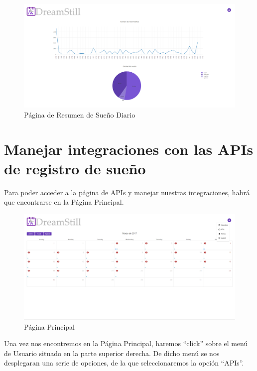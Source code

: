\documentclass[11pt,openany]{book}
\begin{document}
\begin{figure}[H]
\centering
\includegraphics[totalheight=7cm]{manualUsuario/resumenSue_oDiario.png}
\caption{Página de Resumen de Sueño Diario}
\end{figure}

\section{Manejar integraciones con las APIs de registro de sueño}

Para poder acceder a la página de APIs y manejar nuestras integraciones, habrá que encontrarse en la Página Principal.

\begin{figure}[H]
\centering
\includegraphics[totalheight=7cm]{manualUsuario/paginaPrincipal.png}
\caption{Página Principal}
\end{figure}

Una vez nos encontremos en la Página Principal, haremos ``click'' sobre el menú de Usuario situado en la parte superior derecha. De dicho menú se nos desplegaran una serie de opciones, de la que seleccionaremos la opción ``APIs''.
\end{document}
